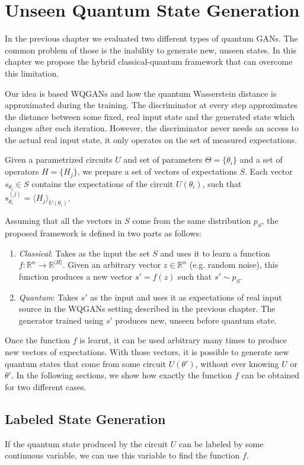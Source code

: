 \chapter{Unseen Quantum State Generation}
\label{chapter:my_contribution}
In the previous chapter we evaluated two different types of quantum GANs. The
common problem of those is the inability to generate new, unseen states. In this
chapter we propose the hybrid classical-quantum framework that can overcome this limitation. 

Our idea is based WQGANs and how the quantum Wasserstein distance is
approximated during the training. The discriminator at every step approximates
the distance between some fixed, real input state and the generated state which
changes after each iteration. However, the discriminator never needs an access to
the actual real input state, it only operates on the set of measured
expectations.

Given a parametrized circuits $U$
and set of parameters $\Theta = \{\theta_i\}$ and a set of operators $H =
\{H_j\}$, we prepare a set of vectors of expectations $S$. Each vector $s_{\theta_i}
\in S$ contains the expectations of the circuit $U(\theta_i)$, such that
$s_{\theta_i}^{(j)} = \langle H_j \rangle_{U(\theta_i)} $.

Assuming that all the vectors in $S$ come from the same distribution $p_S$,
the proposed framework is defined in two parts as follows:
\begin{enumerate}
\item \textit{Classical}: Takes as the input the set $S$ and uses it to learn a function $f:
  \mathbb{R}^{n} \to \mathbb{R}^{|H|}$. Given an arbitrary vector $z \in
  \mathbb{R}^n$ (e.g. random noise), this function produces a new vector $s' =
  f(z)$ such that $s' \sim p_S$.  
\item \textit{Quantum}: Takes $s'$ as the input and uses it as
  expectations of real input source in the WQGANs setting described in the
  previous chapter. The generator trained using $s'$ produces new, unseen before
  quantum state.
\end{enumerate}

Once the function $f$ is learnt, it can be used arbitrary many times to produce
new vectors of expectations.
With those vectors, it is possible to generate new quantum states that come from
some circuit $U(\theta')$, without ever knowing $U$ or $\theta'$.
In the following sections, we show how exactly the function $f$ can be obtained
for two different cases. 
\section{Labeled State Generation}
If the quantum state produced by the circuit $U$ can be labeled by some continuous
variable, we can use this variable to find the function $f$.

